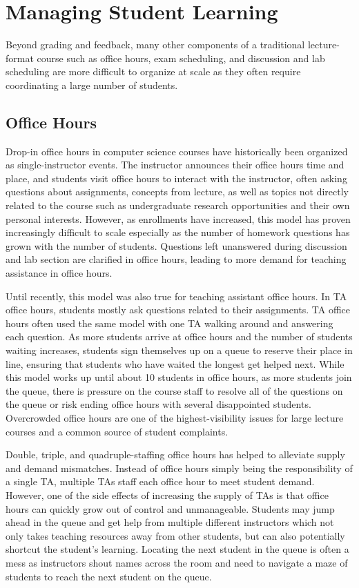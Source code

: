 \section{Managing Student Learning}

Beyond grading and feedback, many other components of a traditional lecture-format course such as office hours, exam scheduling, and discussion and lab scheduling are more difficult to organize at scale as they often require coordinating a large number of students.

\subsection{Office Hours}

Drop-in office hours in computer science courses have historically been organized as single-instructor events. The instructor announces their office hours time and place, and students visit office hours to interact with the instructor, often asking questions about assignments, concepts from lecture, as well as topics not directly related to the course such as undergraduate research opportunities and their own personal interests. However, as enrollments have increased, this model has proven increasingly difficult to scale especially as the number of homework questions has grown with the number of students. Questions left unanswered during discussion and lab section are clarified in office hours, leading to more demand for teaching assistance in office hours.

Until recently, this model was also true for teaching assistant office hours. In TA office hours, students mostly ask questions related to their assignments. TA office hours often used the same model with one TA walking around and answering each question. As more students arrive at office hours and the number of students waiting increases, students sign themselves up on a queue to reserve their place in line, ensuring that students who have waited the longest get helped next. While this model works up until about 10 students in office hours, as more students join the queue, there is pressure on the course staff to resolve all of the questions on the queue or risk ending office hours with several disappointed students. Overcrowded office hours are one of the highest-visibility issues for large lecture courses and a common source of student complaints.

Double, triple, and quadruple-staffing office hours has helped to alleviate supply and demand mismatches. Instead of office hours simply being the responsibility of a single TA, multiple TAs staff each office hour to meet student demand. However, one of the side effects of increasing the supply of TAs is that office hours can quickly grow out of control and unmanageable.  Students may jump ahead in the queue and get help from multiple different instructors which not only takes teaching resources away from other students, but can also potentially shortcut the student's learning. Locating the next student in the queue is often a mess as instructors shout names across the room and need to navigate a maze of students to reach the next student on the queue.

